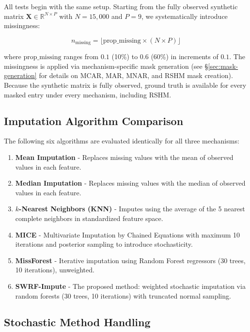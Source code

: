 \documentclass[preprint]{aastex631}
\begin{document}
All tests begin with the same setup. Starting from the fully observed synthetic matrix $\mathbf{X} \in \mathbb{R}^{N \times P}$ with $N = 15{,}000$ and $P = 9$, we systematically introduce missingness:

\begin{equation}
  n_{\text{missing}} = \lfloor \text{prop\_missing} \times (N \times P) \rfloor
\end{equation}

where $\text{prop\_missing}$ ranges from $0.1$ (10\%) to $0.6$ (60\%) in increments of $0.1$. The missingness is applied via mechanism-specific mask generation (see \S\ref{sec:mask-generation} for details on MCAR, MAR, MNAR, and RSHM mask creation). Because the synthetic matrix is fully observed, ground truth is available for every masked entry under every mechanism, including RSHM.

\subsection{Imputation Algorithm Comparison}

The following six algorithms are evaluated identically for all three mechanisms:

\begin{enumerate}
  \item \textbf{Mean Imputation} - Replaces missing values with the mean of observed values in each feature.
  \item \textbf{Median Imputation} - Replaces missing values with the median of observed values in each feature.
  \item \textbf{$k$-Nearest Neighbors (KNN)} - Imputes using the average of the 5 nearest complete neighbors in standardized feature space.
  \item \textbf{MICE} - Multivariate Imputation by Chained Equations with maximum 10 iterations and posterior sampling to introduce stochasticity.
  \item \textbf{MissForest} - Iterative imputation using Random Forest regressors (30 trees, 10 iterations), unweighted.
  \item \textbf{SWRF-Impute} - The proposed method: weighted stochastic imputation via random forests (30 trees, 10 iterations) with truncated normal sampling.
\end{enumerate}

\subsection{Stochastic Method Handling}
\end{document}
